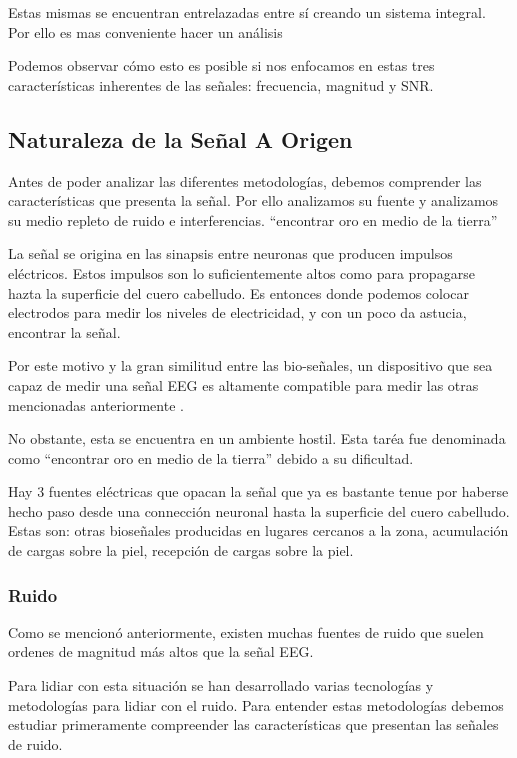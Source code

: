 Estas mismas se encuentran entrelazadas entre sí creando un sistema integral. Por ello es mas conveniente hacer un análisis

Podemos observar cómo esto es posible si nos enfocamos en estas tres características inherentes de las señales: frecuencia, magnitud y SNR.

\subsection{Naturaleza de la Señal A Origen}
\label{sec:org2f59c23}
Antes de poder analizar las diferentes metodologías, debemos comprender las características que presenta la señal. Por ello analizamos su fuente y analizamos su medio repleto de ruido e interferencias. “encontrar oro en medio de la tierra”

La señal se origina en las sinapsis entre neuronas que producen impulsos eléctricos. Estos impulsos son lo suficientemente altos como para propagarse hazta la superficie del cuero cabelludo. Es entonces donde podemos colocar electrodos para medir los niveles de electricidad, y con un poco da astucia, encontrar la señal.

Por este motivo y la gran similitud entre las bio-señales, un dispositivo que sea capaz de medir una señal EEG es altamente compatible para medir las otras mencionadas anteriormente \cite{Ahamed2015}.

No obstante, esta se encuentra en un ambiente hostil. Esta taréa fue denominada como “encontrar oro en medio de la tierra” debido a su dificultad.

Hay 3 fuentes eléctricas que opacan la señal que ya es bastante tenue por haberse hecho paso desde una connección neuronal hasta la superficie del cuero cabelludo. Estas son: otras bioseñales producidas en lugares cercanos a la zona, acumulación de cargas sobre la piel, recepción de cargas sobre la piel.

\subsubsection{Ruido}
\label{sec:orgb65ca51}
Como se mencionó anteriormente, existen muchas fuentes de ruido que suelen ordenes de magnitud más altos que la señal EEG.

Para lidiar con esta situación se han desarrollado varias tecnologías y metodologías para lidiar con el ruido. Para entender estas metodologías debemos estudiar primeramente compreender las características que presentan las señales de ruido.

